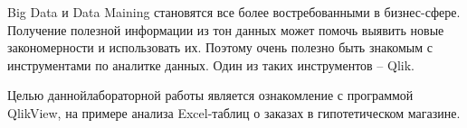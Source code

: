 \Introduction

Big Data и Data Maining становятся все более востребованными в бизнес-сфере.
Получение полезной информации из тон данных может помочь выявить
новые закономерности и использовать их. Поэтому очень полезно быть
знакомым с инструментами по аналитке данных. Один из таких инструментов --
Qlik.

Целью даннойлабораторной работы является ознакомление с программой QlikView,
на примере анализа Excel-таблиц о заказах в гипотетическом магазине.
